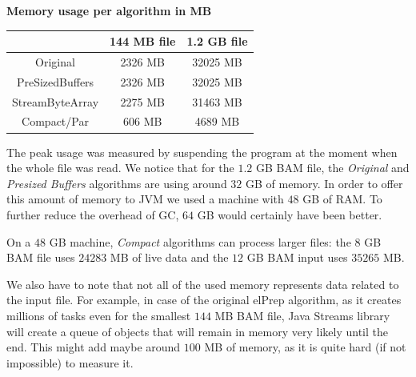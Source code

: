 \documentclass[a4paper,twoside]{article}
\begin{document}


\begin{small}
\begin{center}
\textbf{Memory usage per algorithm in MB} \\
	\begin{tabular}{|c|c|c|}
		\hline			  	& 144 MB file		& 1.2 GB file		\\ \hline
		Original			& 2326 MB			& 32025 MB			\\ \hline
		PreSizedBuffers		& 2326 MB			& 32025 MB			\\ \hline
		StreamByteArray 	& 2275 MB			& 31463 MB			\\ \hline
		Compact/Par			& 606 MB			& 4689 MB			\\ \hline
	\end{tabular}
\end{center}
\end{small}

The peak usage was measured by suspending the program at the moment when the whole file was read.
We notice that for the $1.2$ GB BAM file, the {\it Original} and {\it Presized Buffers} algorithms are using around $32$ GB of memory. In order to offer this amount of memory to JVM we used a machine with $48$ GB of RAM. To further reduce the overhead of GC, $64$ GB would certainly have been better.


On a $48$ GB machine, {\it Compact} algorithms can process larger files: the $8$ GB BAM file uses $24283$ MB of live data and the $12$ GB BAM input uses $35 265$ MB.


We also have to note that not all of the used memory represents data related to the input file.
For example, in case of the original elPrep algorithm, as it creates millions of tasks even for the smallest $144$ MB BAM file, Java Streams library will create a queue of objects that will remain in memory very likely until the end. This might add maybe around $100$ MB of memory, as it is quite hard (if not impossible) to measure it.
\end{document}
